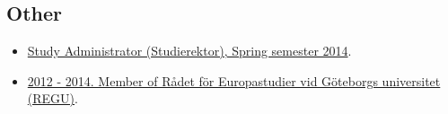 \documentclass[a4paper,11pt,oneside]{article}
\begin{document}
        \subsection{Other}
          \begin{itemize}
            \item \href{http://files.christopherkullenberg.se/studierektoronline.pdf}{Study Administrator (Studierektor), Spring semester 2014}. %
            \item \href{http://files.christopherkullenberg.se/IntygREGU.pdf}{2012 - 2014. Member of Rådet för Europastudier vid Göteborgs universitet (REGU)}. %
          \end{itemize}








\end{document}

